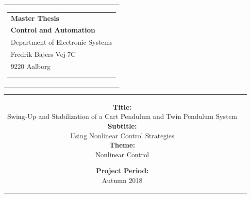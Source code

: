 %
% 
\begin{nopagebreak}
{\samepage 

\begin{tabular}{r}
\parbox{\textwidth}{  \vspace{-1cm}
\hfill \hspace{2cm} \parbox{8cm}{\begin{tabular}{l} %
{\small \textbf{\textcolor{aaublue}{\colorbox{white}{Master Thesis}}}}\\
{\small \textbf{\textcolor{aaublue}{Control and Automation}}}\\ 
{\small \textcolor{aaublue}{Department of Electronic Systems}}\\
{\small \textcolor{aaublue}{Fredrik Bajers Vej 7C}}\\
{\small \textcolor{aaublue}{9220 Aalborg}} \vspace{1.2cm}\\
 \\
\vspace{-2.5cm}
\end{tabular}}}
\end{tabular}

\begin{tabular}{cc}
\parbox{7cm}{

\textbf{Title:} \\
Swing-Up and Stabilization of a Cart Pendulum and Twin Pendulum System \\

\textbf{Subtitle:} \\
Using Nonlinear Control Strategies \\

\textbf{Theme:} \\
\small{Nonlinear Control
\\
}

\parbox{8cm}{

\textbf{Project Period:}\\
Autumn 2018\\
   
}}
\end{tabular}}
\end{nopagebreak}
